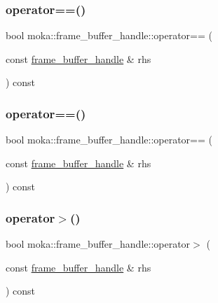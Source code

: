 \mbox{\label{structmoka_1_1frame__buffer__handle_ad1e8780bd34cd59aadd2c922f4fabe54}} 
\subsubsection{\texorpdfstring{operator==()}{operator==()}\hspace{0.1cm}{\footnotesize\ttfamily [1/2]}}
{\footnotesize\ttfamily bool moka\+::frame\+\_\+buffer\+\_\+handle\+::operator== (\begin{DoxyParamCaption}\item[{const \mbox{\hyperlink{structmoka_1_1frame__buffer__handle}{frame\+\_\+buffer\+\_\+handle}} \&}]{rhs }\end{DoxyParamCaption}) const}

\mbox{\label{structmoka_1_1frame__buffer__handle_ad1e8780bd34cd59aadd2c922f4fabe54}} 
\subsubsection{\texorpdfstring{operator==()}{operator==()}\hspace{0.1cm}{\footnotesize\ttfamily [2/2]}}
{\footnotesize\ttfamily bool moka\+::frame\+\_\+buffer\+\_\+handle\+::operator== (\begin{DoxyParamCaption}\item[{const \mbox{\hyperlink{structmoka_1_1frame__buffer__handle}{frame\+\_\+buffer\+\_\+handle}} \&}]{rhs }\end{DoxyParamCaption}) const}

\mbox{\label{structmoka_1_1frame__buffer__handle_a8d3069ff959b4df8113a6047de9a587f}} 
\subsubsection{\texorpdfstring{operator$>$()}{operator>()}\hspace{0.1cm}{\footnotesize\ttfamily [1/2]}}
{\footnotesize\ttfamily bool moka\+::frame\+\_\+buffer\+\_\+handle\+::operator$>$ (\begin{DoxyParamCaption}\item[{const \mbox{\hyperlink{structmoka_1_1frame__buffer__handle}{frame\+\_\+buffer\+\_\+handle}} \&}]{rhs }\end{DoxyParamCaption}) const}

